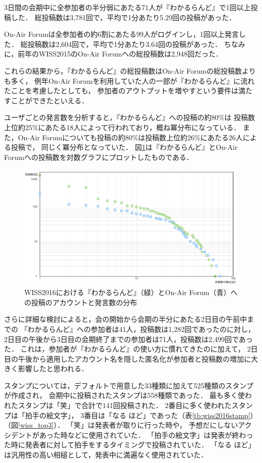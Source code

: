 3日間の会期中に全参加者の半分弱にあたる71人が『わかるらんど』で1回以上投稿した．
総投稿数は3,781回で，平均で1分あたり5.29回の投稿があった．

On-Air Forumは全参加者の約6割にあたる99人がログインし，1回以上発言した．
総投稿数は2,604回で，平均で1分あたり3.64回の投稿があった．
ちなみに，前年のWISS2015のOn-Air Forumへの総投稿数は2,948回だった．

これらの結果から，『わかるらんど』の総投稿数はOn-Air Forumの総投稿数よりも多く，
例年On-Air Forumを利用していた人の一部が『わかるらんど』に流れたことを考慮したとしても，
参加者のアウトプットを増やすという要件は満たすことができたといえる．

ユーザごとの発言数を分析すると，『わかるらんど』への投稿の約80\%は
投稿数上位約25\%にあたる18人によって行われており，概ね冪分布になっている．
また，On-Air Forumについても投稿の約80\%は投稿数上位約26\%にあたる26人による投稿で，
同じく冪分布となっていた．
図\ref{wiss2016compare}は『わかるらんど』とOn-Air Forumへの投稿数を対数グラフにプロットしたものである．

\begin{figure}[H]
\centering
\includegraphics[width=12cm]{images/wiss2016compare.png}
\caption{WISS2016における『わかるらんど』（緑）とOn-Air Forum（青）への投稿のアカウントと発言数の分布}
\label{wiss2016compare}
\end{figure}

さらに詳細な検討によると，会の開始から会期の半分にあたる2日目の午前中までの
『わかるらんど』への参加者は41人，投稿数は1,282回であったのに対し，
2日目の午後から3日目の会期終了までの参加者は71人，投稿数は2,499回であった．
これは，参加者が『わかるらんど』の使い方に慣れてきたのに加えて，
2日目の午後から適用したアカウント名を隠した匿名化が参加者と投稿数の増加に大きく影響したと思われる．

スタンプについては，デフォルトで用意した33種類に加えて525種類のスタンプが作成され，
会期中に投稿されたスタンプは558種類であった．
最も多く使われたスタンプは「笑」で合計で141回投稿された．
2番目に多く使われたスタンプは「拍手の絵文字」，
3番目は「なる ほど」であった（表\ref{tb:wiss2016stamp}）（図\ref{wiss_top3}）．
「笑」は発表者が取りに行った時や，
予想だにしないアクシデントがあった時などに使用されていた．
「拍手の絵文字」は発表が終わった時に発表者に対して拍手をするタイミングで投稿されていた．
「なる ほど」は汎用性の高い相槌として，発表中に満遍なく使用されていた．

